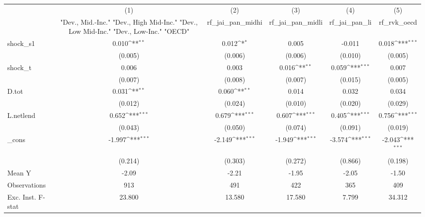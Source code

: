 {
\def\sym#1{\ifmmode^{#1}\else\(^{#1}\)\fi}
\begin{tabular}{l*{5}{c}}
\toprule
            &\multicolumn{1}{c}{(1)}&\multicolumn{1}{c}{(2)}&\multicolumn{1}{c}{(3)}&\multicolumn{1}{c}{(4)}&\multicolumn{1}{c}{(5)}\\
            &\multicolumn{1}{c}{ "Dev., Mid.-Inc." "Dev., High Mid-Inc." "Dev., Low Mid-Inc." "Dev., Low-Inc." "OECD" }&\multicolumn{1}{c}{rf\_jai\_pan\_midhi}&\multicolumn{1}{c}{rf\_jai\_pan\_midli}&\multicolumn{1}{c}{rf\_jai\_pan\_li}&\multicolumn{1}{c}{rf\_rvk\_oecd}\\
\midrule
shock\_s1    &       0.010\sym{**} &       0.012\sym{*}  &       0.005         &      -0.011         &       0.018\sym{***}\\
            &     (0.005)         &     (0.006)         &     (0.006)         &     (0.010)         &     (0.005)         \\
\addlinespace
shock\_t     &       0.006         &       0.003         &       0.016\sym{**} &       0.059\sym{***}&       0.007         \\
            &     (0.007)         &     (0.008)         &     (0.007)         &     (0.015)         &     (0.005)         \\
\addlinespace
D.tot       &       0.031\sym{**} &       0.060\sym{**} &       0.014         &       0.032         &       0.034         \\
            &     (0.012)         &     (0.024)         &     (0.010)         &     (0.020)         &     (0.029)         \\
\addlinespace
L.netlend   &       0.652\sym{***}&       0.679\sym{***}&       0.607\sym{***}&       0.405\sym{***}&       0.756\sym{***}\\
            &     (0.043)         &     (0.050)         &     (0.074)         &     (0.091)         &     (0.019)         \\
\addlinespace
\_cons      &      -1.997\sym{***}&      -2.149\sym{***}&      -1.949\sym{***}&      -3.574\sym{***}&      -2.043\sym{***}\\
            &     (0.214)         &     (0.303)         &     (0.272)         &     (0.866)         &     (0.198)         \\
\midrule
Mean Y      &       -2.09         &       -2.21         &       -1.95         &       -2.05         &       -1.50         \\
Observations&         913         &         491         &         422         &         365         &         409         \\
Exc. Inst. F-stat&      23.800         &      13.580         &      17.580         &       7.799         &      34.312         \\
\bottomrule
\end{tabular}
}
